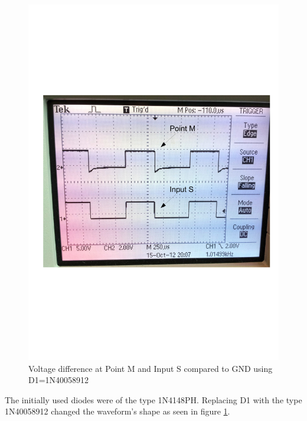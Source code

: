 \documentclass[journal]{IEEEtran}
\begin{document}
\begin{figure}
  \centering
   \includegraphics[trim=15mm 75mm 10mm 80mm, clip,
   width=\columnwidth]{img/shift_volt2.pdf}
   \caption{Voltage difference at Point M and Input S compared to GND using
   D1=1N40058912}
   \label{fig:signal_m2}
\end{figure}

The initially used diodes were of the type 1N4148PH. Replacing D1 with the type
1N40058912 changed the waveform's shape as seen in figure \ref{fig:signal_m2}.
\end{document}
